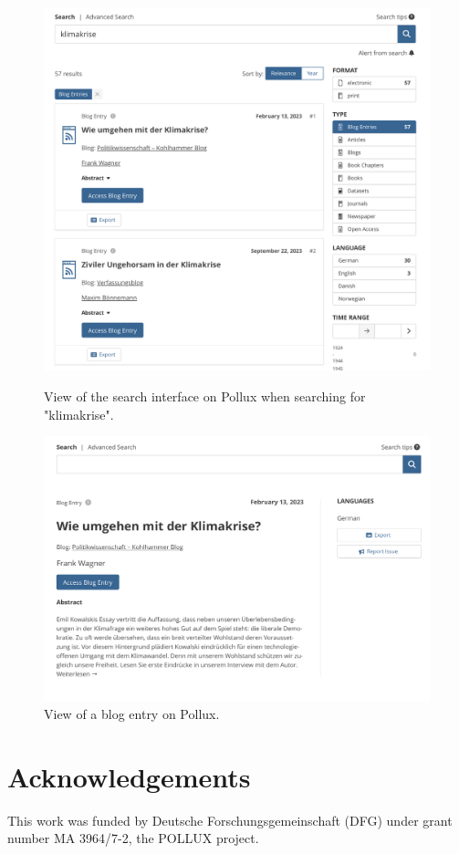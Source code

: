 \documentclass{article}
\begin{document}
\begin{figure}[ht]
	\centering
	\begin{minipage}[t]{0.45\textwidth}
		\centering
		\includegraphics[width=\textwidth]{figures/pollux_web_search_bar.png} %
		\caption{View of the search interface on Pollux when searching for "klimakrise".}
		\label{fig:image1}
	\end{minipage}\hfill
	\begin{minipage}[t]{0.45\textwidth}
		\centering
		\includegraphics[width=\textwidth]{figures/pollux_web_blog_entry.png} %
		\caption{View of a blog entry on Pollux.}
		\label{fig:image2}
	\end{minipage}
\end{figure}


\section*{Acknowledgements}
This work was funded by Deutsche Forschungsgemeinschaft (DFG) under grant number MA 3964/7-2, the POLLUX project.




\end{document}
